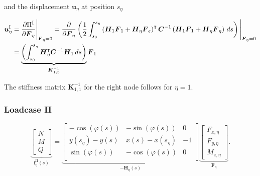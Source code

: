 and the displacement $\boldsymbol{u}_\eta$ at position $s_\eta$

\begin{align}
\boldsymbol{u}^{\mathrm{I}}_\eta &= \frac{\partial \Pi^{\mathrm{I}}}{\partial \boldsymbol{F}_\eta}\Bigg|_{\boldsymbol{F}_\eta = 0} = \frac{\partial}{\partial \boldsymbol{F}_\eta}\left(\frac{1}{2}\int_{s_0}^{s_\eta} \left(\boldsymbol{H}_{1}\boldsymbol{F}_1 + \boldsymbol{H}_{\eta}\boldsymbol{F}_e\right)^\intercal\boldsymbol{C}^{-1}\left(\boldsymbol{H}_{1}\boldsymbol{F}_1 + \boldsymbol{H}_{\eta}\boldsymbol{F}_\eta\right)\,ds\right)\Bigg|_{\boldsymbol{F}_\eta = 0} \notag \\
&= \underbrace{\left(\int_{s_0}^{s_\eta} \boldsymbol{H}_\eta^\intercal\boldsymbol{C}^{-1}\boldsymbol{H}_1\,ds\right)}_{\boldsymbol{K}^{-1}_{1,\eta}}\boldsymbol{F}_1
\end{align}

The stiffness matrix $\boldsymbol{K}^{-1}_{1,1}$ for the right node follows for $\eta = 1$.

%

\subsubsection*{Loadcase II}

\begin{equation}
\underbrace{
\begin{bmatrix}
N \\ M \\ Q
\end{bmatrix}
}_{\boldsymbol{f}^{\mathrm{II}}_{\eta}(s)}
=
\underbrace{
\begin{bmatrix}
-\cos(\varphi(s)) & -\sin(\varphi(s)) & 0 \\
y(s_\eta) - y(s) & x(s) - x(s_\eta) & -1 \\
\sin(\varphi(s)) & -\cos(\varphi(s)) & 0 \\
\end{bmatrix}
}_{-\boldsymbol{H}_{\eta}(s)}
\underbrace{
\begin{bmatrix}
F_{x,\eta} \\ F_{y,\eta} \\ M_{z,\eta}
\end{bmatrix}
}_{\boldsymbol{F}_\eta}. \label{eq:section-static-equilibrium}
\end{equation}

